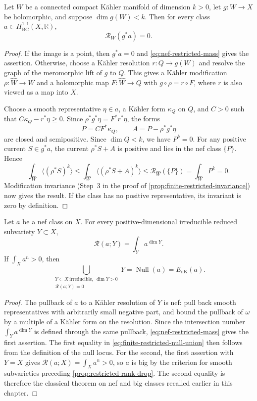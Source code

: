 \begin{proposition}\label{prop:restricted-rank-drop}
Let $W$ be a connected compact K\"ahler manifold of dimension $k>0$, let $g\colon W\to X$ be holomorphic, and suppose $\dim g(W)<k$. Then for every class $a\in H^{1,1}_{\mathrm{BC}}(X,\mathbb R)$,
\[
 \mathcal R_W(g^*a)=0.
\]
\end{proposition}
\begin{proof}
If the image is a point, then $g^*a=0$ and \eqref{eq:nef-restricted-mass} gives the assertion. Otherwise, choose a K\"ahler resolution $r\colon Q\to g(W)$ and resolve the graph of the meromorphic lift of $g$ to $Q$. This gives a K\"ahler modification $\rho\colon\widehat W\to W$ and a holomorphic map $F\colon\widehat W\to Q$ with $g\circ\rho=r\circ F$, where $r$ is also viewed as a map into $X$.

Choose a smooth representative $\eta\in a$, a K\"ahler form $\kappa_Q$ on $Q$, and $C>0$ such that $C\kappa_Q-r^*\eta\geq0$. Since $\rho^*g^*\eta=F^*r^*\eta$, the forms
\[
 P=CF^*\kappa_Q,
 \qquad A=P-\rho^*g^*\eta
\]
are closed and semipositive. Since $\dim Q<k$, we have $P^k=0$. For any positive current $S\in g^*a$, the current $\rho^*S+A$ is positive and lies in the nef class $\{P\}$. Hence
\[
 \int_{\widehat W}\langle(\rho^*S)^k\rangle
 \leq\int_{\widehat W}\langle(\rho^*S+A)^k\rangle
 \leq\mathcal R_{\widehat W}(\{P\})
 =\int_{\widehat W}P^k=0.
\]
Modification invariance (Step~3 in the proof of \cref{prop:finite-restricted-invariance}) now gives the result. If the class has no positive representative, its invariant is zero by definition.
\end{proof}

\begin{corollary}\label{cor:finite-restricted-null-union}
Let $a$ be a nef class on $X$. For every positive-dimensional irreducible reduced subvariety $Y\subset X$,
\[
 \mathcal R(a;Y)=\int_Ya^{\dim Y}.
\]
If $\int_Xa^n>0$, then
\begin{equation}\label{eq:finite-restricted-null-union}
 \bigcup_{\substack{Y\subset X\ \mathrm{irreducible},\ \dim Y>0\\
                         \mathcal R(a;Y)=0}}Y
       =\operatorname{Null}(a)=E_{\mathrm{nK}}(a).
\end{equation}
\end{corollary}
\begin{proof}
The pullback of $a$ to a K\"ahler resolution of $Y$ is nef: pull back smooth representatives with arbitrarily small negative part, and bound the pullback of $\omega$ by a multiple of a K\"ahler form on the resolution. Since the intersection number $\int_Ya^{\dim Y}$ is defined through the same pullback, \eqref{eq:nef-restricted-mass} gives the first assertion. The first equality in \eqref{eq:finite-restricted-null-union} then follows from the definition of the null locus. For the second, the first assertion with $Y=X$ gives $\mathcal R(a;X)=\int_Xa^n>0$, so $a$ is big by the criterion for smooth subvarieties preceding \cref{prop:restricted-rank-drop}. The second equality is therefore the classical theorem on nef and big classes recalled earlier in this chapter.
\end{proof}


